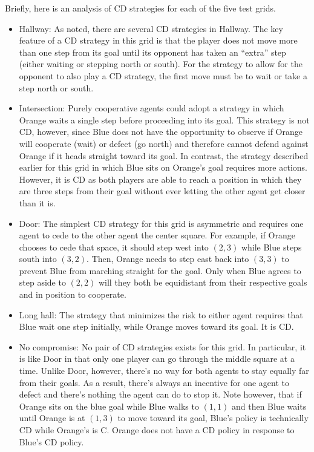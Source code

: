 \documentclass[letterpaper]{article}
\begin{document}
Briefly, here is an analysis of CD strategies for each of the five
test grids.

\begin{itemize}

\item{Hallway}: As noted, there are several CD strategies in
Hallway. The key feature of a CD strategy in this grid is that the
player does not move more than one step from its goal until its
opponent has taken an ``extra'' step (either waiting or stepping north
or south). For the strategy to allow for the opponent to also play a
CD strategy, the first move must be to wait or take a step north or
south.

\item{Intersection}: Purely cooperative agents could adopt a strategy
in which Orange waits a single step before proceeding into its
goal. This strategy is not CD, however, since Blue does not have the
opportunity to observe if Orange will cooperate (wait) or defect (go
north) and therefore cannot defend against Orange if it heads straight
toward its goal. In contrast, the strategy described earlier for this
grid in which Blue sits on Orange's goal requires more
actions. However, it is CD as both players are able to reach a
position in which they are three steps from their goal without ever
letting the other agent get closer than it is.

\item{Door}: The simplest CD strategy for this grid is asymmetric and
requires one agent to cede to the other agent the center square. For
example, if Orange chooses to cede that space, it should step west
into $(2,3)$ while Blue steps south into $(3,2)$. Then, Orange needs
to step east back into $(3,3)$ to prevent Blue from marching straight
for the goal. Only when Blue agrees to step aside to $(2,2)$ will they
both be equidistant from their respective goals and in position to
cooperate.

\item{Long hall}: The strategy that minimizes the risk to either agent
requires that Blue wait one step initially, while Orange
moves toward its goal. It is CD.

\item{No compromise}: No pair of CD strategies exists for this grid. In
particular, it is like Door in that only one player can go through the
middle square at a time. Unlike Door, however, there's no way for both
agents to stay equally far from their goals. As a result, there's
always an incentive for one agent to defect and there's nothing the
agent can do to stop it. Note however, that if Orange sits on the blue
goal while Blue walks to $(1,1)$ and then Blue waits until Orange is
at $(1,3)$ to move toward its goal, Blue's policy is technically CD
while Orange's is C. Orange does not have a CD policy in response to
Blue's CD policy.

\end{itemize}
\end{document}
